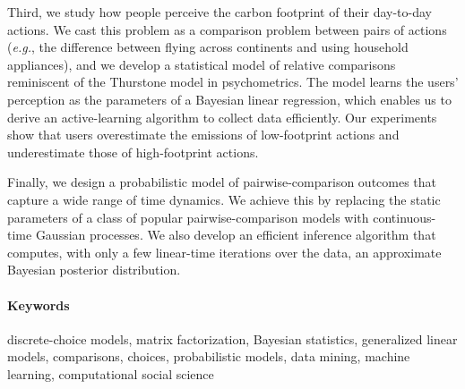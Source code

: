 Third, we study how people perceive the carbon footprint of their day-to-day actions.
We cast this problem as a comparison problem between pairs of actions (\textit{e.g.}, the difference between flying across continents and using household appliances), and we develop a statistical model of relative comparisons reminiscent of the Thurstone model in psychometrics.
The model learns the users’ perception as the parameters of a Bayesian linear regression, which enables us to derive an active-learning algorithm to collect data efficiently.
Our experiments show that users overestimate the emissions of low-footprint actions and underestimate those of high-footprint actions.

Finally, we design a probabilistic model of pairwise-comparison outcomes that capture a wide range of time dynamics.
We achieve this by replacing the static parameters of a class of popular pairwise-comparison models with continuous-time Gaussian processes.
We also develop an efficient inference algorithm that computes, with only a few linear-time iterations over the data, an approximate Bayesian posterior distribution.

\paragraph{Keywords}
discrete-choice models, matrix factorization, Bayesian statistics, generalized linear models, comparisons, choices, probabilistic models, data mining, machine learning, computational social science

\cleardoublepage

